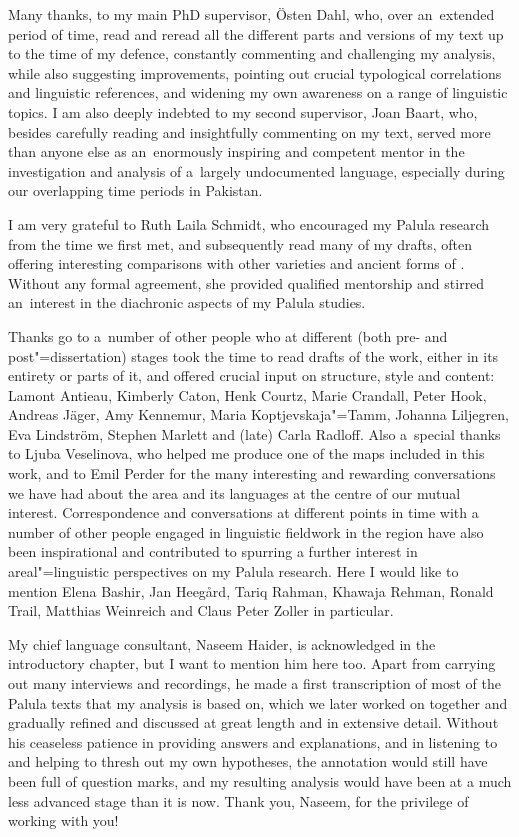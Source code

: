 \begin{refsection}
Many thanks, to my main PhD supervisor, Östen Dahl, who, over
an~extended period of time, read and reread all the different parts and versions of my text up to the time of my defence, constantly commenting and challenging my analysis, while also suggesting improvements, pointing out crucial typological correlations and linguistic references, and widening my own awareness on a range of linguistic topics. I am also deeply indebted to my second supervisor, Joan Baart, who,
besides carefully reading and insightfully commenting on my text, served more than anyone else as an~enormously inspiring and competent mentor in the investigation and analysis of a~largely undocumented language, especially during our overlapping time periods in Pakistan.


I am very grateful to Ruth Laila Schmidt, who encouraged my Palula research from the time we first met, and subsequently read many of my drafts, often offering interesting comparisons with other \iliShina varieties and ancient forms of \iliIndoAryan. Without any formal agreement, she
provided qualified mentorship and stirred an~interest in the diachronic aspects of my Palula studies.


Thanks go to a~number of other people who at different (both pre- and post"=dissertation) stages took the time to read drafts of the work, either in its entirety or parts of it, and offered crucial input on structure, style and content: Lamont Antieau, Kimberly Caton, Henk Courtz, Marie Crandall, Peter Hook, Andreas Jäger, Amy Kennemur, Maria Koptjevskaja"=Tamm, Johanna Liljegren, Eva Lindström, Stephen Marlett and (late) Carla Radloff. Also a~special thanks to Ljuba Veselinova, who helped me produce one of the maps included in this work, and to Emil Perder for the many interesting and rewarding conversations we have had about
the area and its languages at the centre of our mutual interest. Correspondence and conversations at different points in time with a number of other people engaged in linguistic fieldwork in the region have also been inspirational and contributed to spurring a further interest in areal"=linguistic perspectives on my Palula research. Here I would like to mention Elena Bashir, Jan Heegård, Tariq Rahman, Khawaja Rehman, Ronald Trail, Matthias Weinreich and Claus Peter Zoller in particular.


My chief language consultant, Naseem Haider, is acknowledged in the introductory chapter, but I want to mention him here too. Apart from carrying out many interviews and recordings, he made a first transcription of most of the Palula texts that my analysis is based on, which we later worked on together and gradually refined and discussed at great length and in extensive detail. Without his ceaseless patience in providing answers and explanations, and in listening to and helping to thresh out my own hypotheses, the annotation would still have been full of question marks, and my resulting analysis would have been at a much less advanced stage than it is now. Thank you, Naseem, for the privilege of working with you!



\end{refsection}
